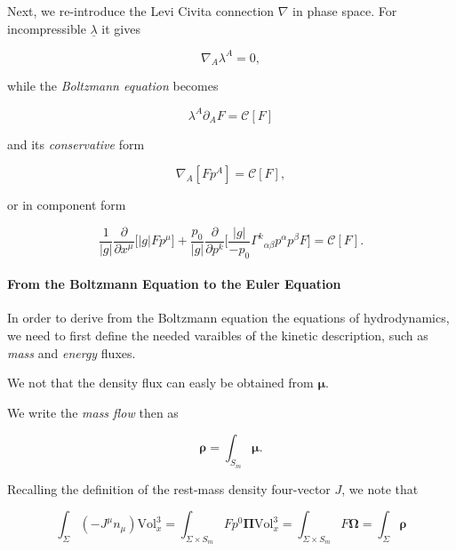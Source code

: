 Next, we re-introduce the Levi Civita connection $\nabla$ in phase space. 
For incompressible $\underline{\lambda}$ it gives

\begin{equation}
\nabla_A\lambda^A=0,
\end{equation}

while the \textit{Boltzmann equation} becomes 

\begin{equation}
\lambda^A\partial_A F=\mathcal{C}[F]
\end{equation}

and its \textit{conservative} form 

\begin{equation}
\nabla_A[Fp^{A}] = \mathcal{C}[F],
\label{eq:theory:liouvilletheorem}
\end{equation}

or in component form

\begin{equation}
\frac{1}{|g|}\frac{\partial}{\partial x^{\mu}}\Bigg[|g|Fp^{\mu}\Bigg] + \frac{p_0}{|g|}\frac{\partial}{\partial p^{k}}\Bigg[\frac{|g|}{-p_0}{\Gamma^k}_{\alpha\beta}p^{\alpha}p^{\beta}F\Bigg] = \mathcal{C}[F].
\end{equation}



\paragraph{From the Boltzmann Equation to the Euler Equation}



In order to derive from the Boltzmann equation the equations of hydrodynamics, we need to first define the needed varaibles of the kinetic description, such as \textit{mass} and \textit{energy} fluxes. 

We not that the density flux can easly be obtained from $\boldsymbol{\mu}$. 

We write the \textit{mass flow} then as 

\begin{equation}
\boldsymbol{\rho} = \int_{S_m} \boldsymbol{\mu}.
\end{equation}

Recalling the definition of the rest-mass density four-vector $J$, we note that

\begin{equation}
\int_{\Sigma}(-J^{\mu}n_{\mu})\text{Vol}_x ^3 = \int_{\Sigma\times S_{m}} Fp^0\boldsymbol{\Pi}\text{Vol}_x ^3 = \int_{\Sigma\times S_{m}} F\boldsymbol{\Omega} = \int_{\Sigma}\boldsymbol{\rho}
\end{equation}

